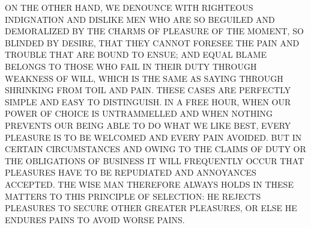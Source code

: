\uppercase{On the other hand, we denounce with righteous indignation
  and dislike men who are so beguiled and demoralized by the charms of
  pleasure of the moment, so blinded by desire, that they cannot
  foresee the pain and trouble that are bound to ensue; and equal
  blame belongs to those who fail in their duty through weakness of
  will, which is the same as saying through shrinking from toil and
  pain. These cases are perfectly simple and easy to distinguish. In a
  free hour, when our power of choice is untrammelled and when nothing
  prevents our being able to do what we like best, every pleasure is
  to be welcomed and every pain avoided. But in certain circumstances
  and owing to the claims of duty or the obligations of business it
  will frequently occur that pleasures have to be repudiated and
  annoyances accepted. The wise man therefore always holds in these
  matters to this principle of selection: he rejects pleasures to
  secure other greater pleasures, or else he endures pains to avoid
  worse pains.} 
